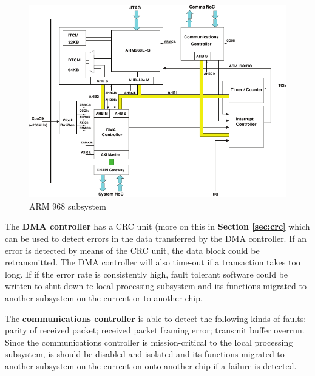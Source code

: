 \documentclass[a4paper, 11pt]{article}
\begin{document}
\begin{figure}[t]
	\centering
	\includegraphics[width=0.7\linewidth]{images/arm968_subsystem.pdf}
	\caption{ARM 968 subsystem}
	\label{fig:arm968}
\end{figure}

The \textbf{DMA controller} has a CRC unit (more on this in \textbf{Section \ref{sec:crc}} which can be used to detect errors in the data transferred by the DMA controller. If an error is detected by means of the CRC unit, the data block could be retransmitted. The DMA controller will also time-out if a transaction takes too long. If if the error rate is consistently high, fault tolerant software could be written to shut down te local processing subsystem and its functions migrated to another subsystem on the current or to another chip.

The \textbf{communications controller} is able to detect the following kinds of faults:
parity of received packet; received packet framing error; transmit buffer overrun. Since the communications controller is mission-critical to the local processing subsystem, is should be disabled and isolated and its functions migrated to another subsystem on the current on onto another chip if a failure is detected.
\end{document}

